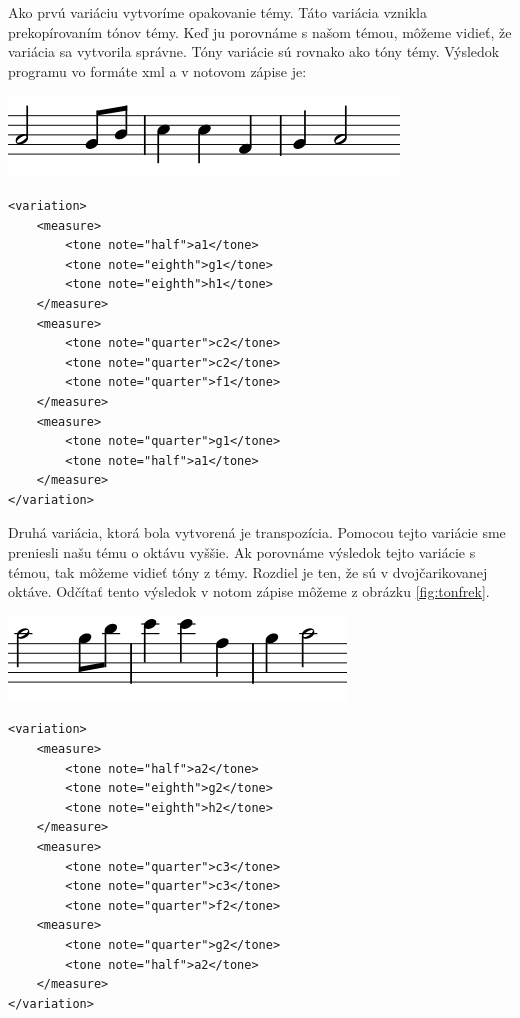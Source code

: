 Ako prvú variáciu vytvoríme opakovanie témy. Táto variácia vznikla prekopírovaním tónov témy. Keď ju porovnáme s našom témou, môžeme vidieť, že variácia sa vytvorila správne. Tóny variácie sú rovnako ako tóny témy. Výsledok programu vo formáte xml a v notovom zápise je:

\begin{minipage}{.45\textwidth}
\includegraphics[width=\textwidth]{thesis/obrazky-figures/var1.png}
\end{minipage}%
\begin{minipage}{.5\textwidth}
\centering
\lstset{language=XML}
\begin{lstlisting}[basicstyle=\tiny]
<variation>
    <measure>
        <tone note="half">a1</tone>
        <tone note="eighth">g1</tone>
        <tone note="eighth">h1</tone>
    </measure>
    <measure>
        <tone note="quarter">c2</tone>
        <tone note="quarter">c2</tone>
        <tone note="quarter">f1</tone>
    </measure>
    <measure>
        <tone note="quarter">g1</tone>
        <tone note="half">a1</tone>
    </measure>
</variation>
\end{lstlisting}
\end{minipage}

Druhá variácia, ktorá bola vytvorená je transpozícia. Pomocou tejto variácie sme preniesli našu tému o oktávu vyššie. Ak porovnáme výsledok tejto variácie s témou, tak môžeme vidieť tóny z témy. Rozdiel je ten, že sú v dvojčarikovanej oktáve. Odčítať tento výsledok v notom zápise môžeme z obrázku \ref{fig:tonfrek}.

\begin{minipage}{.45\textwidth}
\includegraphics[width=\textwidth]{thesis/obrazky-figures/var22.png}
\end{minipage}%
\begin{minipage}{.5\textwidth}
\centering
\lstset{language=XML}
\begin{lstlisting}[basicstyle=\tiny]
<variation>
    <measure>
        <tone note="half">a2</tone>
        <tone note="eighth">g2</tone>
        <tone note="eighth">h2</tone>
    </measure>
    <measure>
        <tone note="quarter">c3</tone>
        <tone note="quarter">c3</tone>
        <tone note="quarter">f2</tone>
    <measure>
        <tone note="quarter">g2</tone>
        <tone note="half">a2</tone>
    </measure>
</variation>
\end{lstlisting}
\end{minipage}


